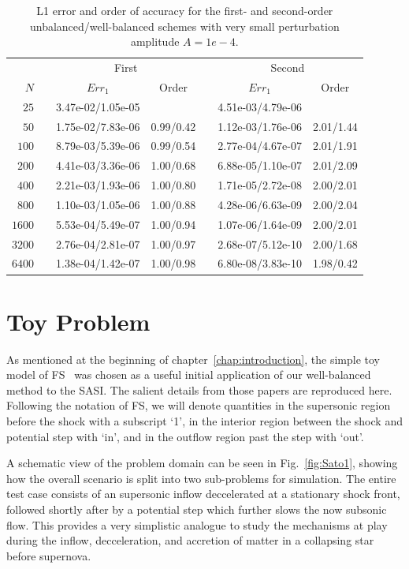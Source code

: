 \begin{table}\centering
\caption{L1 error and order of accuracy for the first- and second-order unbalanced/well-balanced schemes with very small perturbation amplitude $A=1e-4$.}
\label{table:OVS_Asmall}
\begin{tabular}{@{}rcccccc@{}}\toprule
& \phantom{a} & \multicolumn{2}{c}{First} & \phantom{ab} & \multicolumn{2}{c}{Second}\\
\cmidrule{3-4} \cmidrule{6-7}
$N$ && $Err_1$ & Order && $Err_1$ & Order\\ \midrule
$25$ && 3.47e-02/1.05e-05 &&& 4.51e-03/4.79e-06 &\\
$50$ && 1.75e-02/7.83e-06 & 0.99/0.42 && 1.12e-03/1.76e-06 & 2.01/1.44\\
$100$ && 8.79e-03/5.39e-06 & 0.99/0.54 && 2.77e-04/4.67e-07 & 2.01/1.91\\
$200$ && 4.41e-03/3.36e-06 & 1.00/0.68 && 6.88e-05/1.10e-07 & 2.01/2.09\\
$400$ && 2.21e-03/1.93e-06 & 1.00/0.80 && 1.71e-05/2.72e-08 & 2.00/2.01\\
$800$ && 1.10e-03/1.05e-06 & 1.00/0.88 && 4.28e-06/6.63e-09 & 2.00/2.04\\
$1600$ && 5.53e-04/5.49e-07 & 1.00/0.94 && 1.07e-06/1.64e-09 & 2.00/2.01\\
$3200$ && 2.76e-04/2.81e-07 & 1.00/0.97 && 2.68e-07/5.12e-10 & 2.00/1.68\\
$6400$ && 1.38e-04/1.42e-07 & 1.00/0.98 && 6.80e-08/3.83e-10 & 1.98/0.42\\
\bottomrule
\end{tabular}
\end{table}


\section{Toy Problem}
\label{sec:toyProblem}

As mentioned at the beginning of chapter~\ref{chap:introduction}, the simple toy model of FS~\cite{Foglizzo2009,Sato2009} was chosen as a useful initial application of our well-balanced method to the SASI. The salient details from those papers  are reproduced here. Following the notation of FS, we will denote quantities in the supersonic region before the shock with a subscript `1', in the interior region between the shock and potential step with `in', and in the outflow region past the step with `out'.

A schematic view of the problem domain can be seen in Fig.~\ref{fig:Sato1}, showing how the overall scenario is split into two sub-problems for simulation. The entire test case consists of an supersonic inflow deccelerated at a stationary shock front, followed shortly after by a potential step which further slows the now subsonic flow. This provides a very simplistic analogue to study the mechanisms at play during the inflow, decceleration, and accretion of matter in a collapsing star before supernova.

